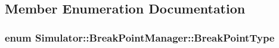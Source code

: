 \subsection{Member Enumeration Documentation}
\hypertarget{class_simulator_1_1_break_point_manager_a425072fcb3c0e59e3fb6f300d6afbd7b}{
\subsubsection[{Break\+Point\+Type}]{\setlength{\rightskip}{0pt plus 5cm}enum {\bf Simulator\+::\+Break\+Point\+Manager\+::\+Break\+Point\+Type}}}\label{class_simulator_1_1_break_point_manager_a425072fcb3c0e59e3fb6f300d6afbd7b}
